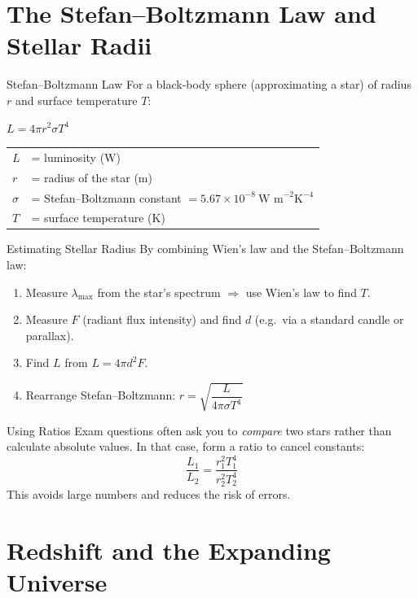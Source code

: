 \section{The Stefan--Boltzmann Law and Stellar Radii}

\begin{formulabox}{Stefan--Boltzmann Law}
For a black-body sphere (approximating a star) of radius $r$ and surface temperature $T$:
\begin{center}
\Large $L = 4\pi r^2 \sigma T^4$
\end{center}
\vspace{0.3em}
\begin{tabular}{@{}ll@{}}
$L$ & = luminosity (W) \\
$r$ & = radius of the star (m) \\
$\sigma$ & = Stefan--Boltzmann constant $= 5.67\times10^{-8}\ \text{W m}^{-2}\text{K}^{-4}$ \\
$T$ & = surface temperature (K) \\
\end{tabular}
\end{formulabox}

\begin{keybox}{Estimating Stellar Radius}
By combining Wien's law and the Stefan--Boltzmann law:
\begin{enumerate}[itemsep=3pt]
  \item Measure $\lambda_{\max}$ from the star's spectrum $\Rightarrow$ use Wien's law to find $T$.
  \item Measure $F$ (radiant flux intensity) and find $d$ (e.g.\ via a standard candle or parallax).
  \item Find $L$ from $L = 4\pi d^2 F$.
  \item Rearrange Stefan--Boltzmann: $r = \sqrt{\dfrac{L}{4\pi\sigma T^4}}$
\end{enumerate}
\end{keybox}

\begin{warningbox}{Using Ratios}
Exam questions often ask you to \emph{compare} two stars rather than calculate absolute values. In that case, form a ratio to cancel constants:
$$\frac{L_1}{L_2} = \frac{r_1^2 T_1^4}{r_2^2 T_2^4}$$
This avoids large numbers and reduces the risk of errors.
\end{warningbox}

\section{Redshift and the Expanding Universe}

